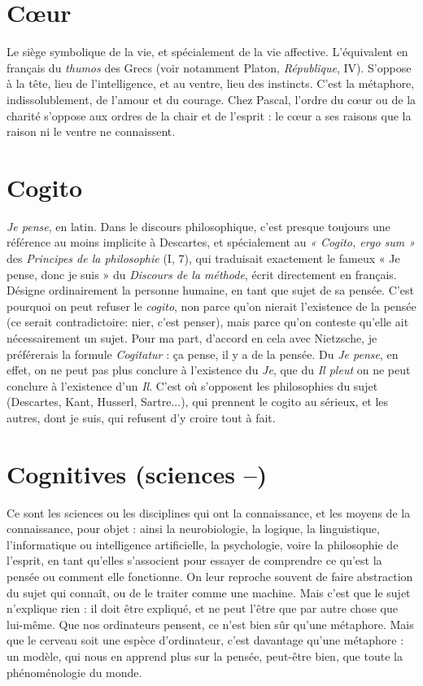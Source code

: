 \section{C{\oe}ur}
Le siège symbolique de la vie, et spécialement de la vie affective.
L’équivalent en français du {\it thumos} des Grecs (voir notamment
Platon, {\it République}, IV). S’oppose à la tête, lieu de l’intelligence, et au ventre,
lieu des instincts. C’est la métaphore, indissolublement, de l’amour et du courage.
Chez Pascal, l’ordre du cœur ou de la charité s'oppose aux ordres de la chair
et de l'esprit : le cœur a ses raisons que la raison ni le ventre ne connaissent.

\section{Cogito}
{\it Je pense}, en latin. Dans le discours philosophique, c’est presque
toujours une référence au moins implicite à Descartes, et spécialement
au {\it « Cogito, ergo sum »} des {\it Principes de la philosophie} (I, 7), qui traduisait
exactement le fameux « Je pense, donc je suis » du {\it Discours de la méthode},
écrit directement en français. Désigne ordinairement la personne humaine, en
tant que sujet de sa pensée. C’est pourquoi on peut refuser le {\it cogito}, non parce
qu’on nierait l’existence de la pensée (ce serait contradictoire: nier, c’est
penser), mais parce qu’on conteste qu’elle ait nécessairement un sujet. Pour ma
part, d’accord en cela avec Nietzsche, je préférerais la formule {\it Cogitatur} : ça
pense, il y a de la pensée. Du {\it Je pense}, en effet, on ne peut pas plus conclure à
l'existence du {\it Je}, que du {\it Il pleut} on ne peut conclure à l’existence d’un {\it Il}. C’est
où s'opposent les philosophies du sujet (Descartes, Kant, Husserl, Sartre...),
qui prennent le cogito au sérieux, et les autres, dont je suis, qui refusent d’y
croire tout à fait.

\section{Cognitives (sciences {\bf --})}
Ce sont les sciences ou les disciplines qui
ont la connaissance, et les moyens de la
connaissance, pour objet : ainsi la neurobiologie, la logique, la linguistique,
l'informatique ou intelligence artificielle, la psychologie, voire la philosophie de
l'esprit, en tant qu’elles s'associent pour essayer de comprendre ce qu'est la
pensée ou comment elle fonctionne. On leur reproche souvent de faire abstraction
du sujet qui connaît, ou de le traiter comme une machine. Mais c’est que
le sujet n’explique rien : il doit être expliqué, et ne peut l’être que par autre
chose que lui-même. Que nos ordinateurs pensent, ce n’est bien sûr qu’une
métaphore. Mais que le cerveau soit une espèce d’ordinateur, c’est davantage
qu’une métaphore : un modèle, qui nous en apprend plus sur la pensée, peut-être
bien, que toute la phénoménologie du monde.

